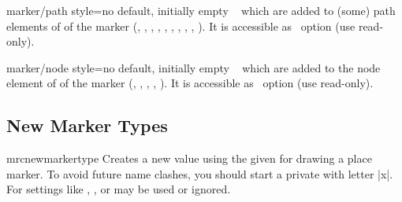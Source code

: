 \begin{docMrcKey}{marker/path style}{=}{no default, initially empty}
  \tikzname\  which are added to (some) path elements of
  of the marker
  (, , , ,
    , , , ,
    , ).
  It is accessible as \tikzname\ option  (use read-only).
\end{docMrcKey}

\begin{docMrcKey}{marker/node style}{=}{no default, initially empty}
  \tikzname\  which are added to the node element of
  of the marker
  (, , , , ).
  It is accessible as \tikzname\ option  (use read-only).
\end{docMrcKey}



\subsection{New Marker Types}

\begin{docCommand}{mrcnewmarkertype}{}
  Creates a new  value  using the
  given  for drawing a place marker.
  To avoid future name clashes, you should start a private 
  with letter |x|. For  settings like
  ,
  , or  may be used
  or ignored.

  \begin{dispExample}
  \end{dispExample}
\end{docCommand}



